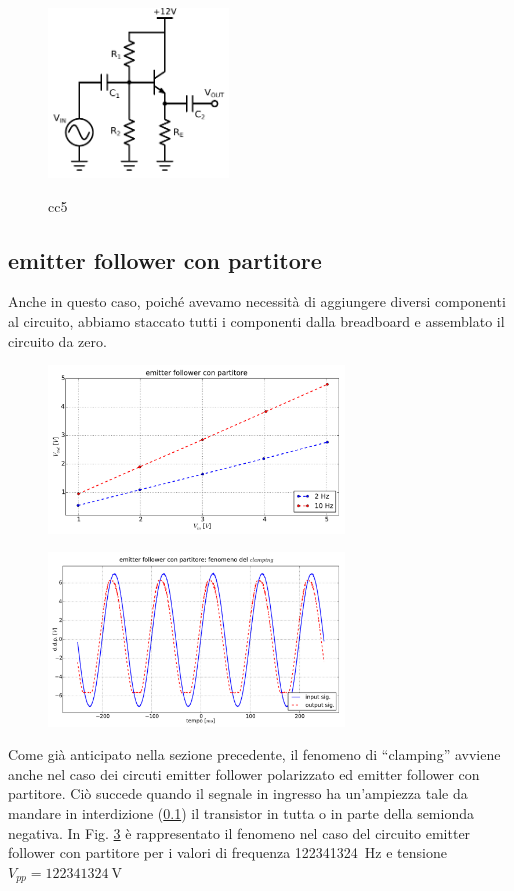 \begin{figure}
	\caption{cc5}
	\includegraphics[height=45mm]{cc5.pdf}
	\label{fig:cc5}
\end{figure}

\subsection{emitter follower con partitore}
Anche in questo caso, poiché avevamo necessità di aggiungere diversi componenti al circuito, abbiamo staccato tutti i componenti dalla breadboard e assemblato il circuito da zero.

\begin{figure}[h]
\centering
	\includegraphics[width=0.7\textwidth]{am.pdf}
	\caption{}
	\label{fig:am}
\end{figure}

\begin{figure}[h]
\centering
	\includegraphics[width=0.7\textwidth]{clamp.pdf}
	\caption{}
	\label{fig:clamp}
\end{figure}

Come già anticipato nella sezione precedente, il fenomeno di ``clamping'' avviene anche nel caso dei circuti emitter follower polarizzato ed emitter follower con partitore.
Ciò succede quando il segnale in ingresso ha un'ampiezza tale da mandare in interdizione (\ref{}) il transistor in tutta o in parte  della semionda negativa.
In Fig. \ref{fig:clamp} è rappresentato il fenomeno nel caso del circuito emitter follower con partitore per i valori di frequenza \SI{122341324}{\hertz} e tensione $V_{pp} = \SI{122341324}{\volt}$